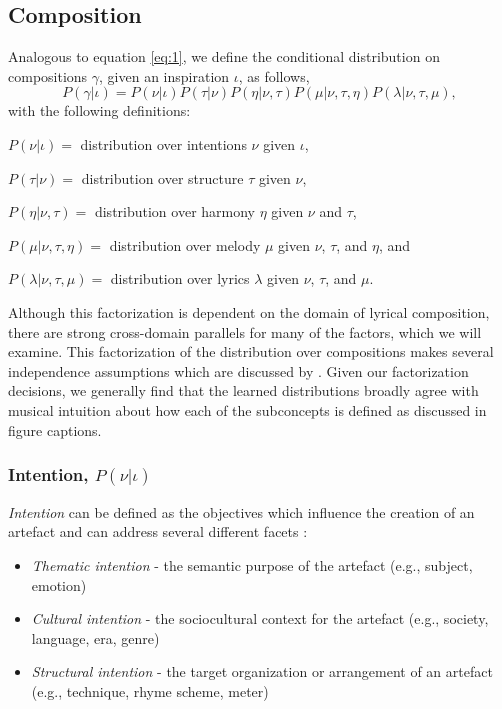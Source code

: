 \documentclass[letterpaper]{article}
\begin{document}
\subsection{Composition}

Analogous to equation \ref{eq:1}, we define the conditional distribution on compositions $\gamma$, given an inspiration $\iota$, as follows,
\[ P(\gamma|\iota) = P(\nu|\iota)P(\tau|\nu)P(\eta|\nu,\tau)P(\mu|\nu,\tau,\eta)P(\lambda|\nu,\tau,\mu), \] 
\noindent with the following definitions:

\(P(\nu|\iota)=\) distribution over intentions $\nu$ given $\iota$,

\(P(\tau|\nu)=\) distribution over structure $\tau$ given $\nu$,

\(P(\eta|\nu,\tau)=\) distribution over harmony $\eta$ given $\nu$ and $\tau$,

\(P(\mu|\nu,\tau,\eta)=\) distribution over melody $\mu$ given $\nu$, $\tau$, and $\eta$, and

\(P(\lambda|\nu,\tau,\mu)=\) distribution over lyrics $\lambda$ given $\nu$, $\tau$, and $\mu$.

Although this factorization is dependent on the domain of lyrical composition, there are strong cross-domain parallels for many of the factors, which we will examine. This factorization of the distribution over compositions makes several independence assumptions which are discussed by \citeauthor{bodily2017Mume} . Given our factorization decisions, we generally find that the learned distributions broadly agree with musical intuition about how each of the subconcepts is defined as discussed in figure captions.

\subsubsection{Intention, $P(\nu|\iota)$}

\emph{Intention} can be defined as the objectives which influence the creation of an artefact and can address several different facets \cite{bay2017ICCC}:

\begin{itemize}  
\item \emph{Thematic intention} - the semantic purpose of the artefact (e.g., subject, emotion)
\item \emph{Cultural intention} - the sociocultural context for the artefact (e.g., society, language, era, genre)
\item \emph{Structural intention} - the target organization or arrangement of an artefact (e.g., technique, rhyme scheme, meter)
\end{itemize}
\end{document}
